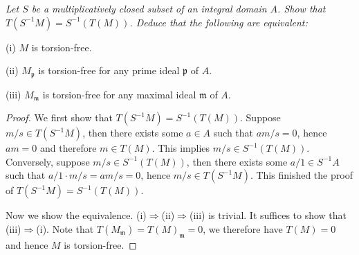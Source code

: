 \begin{problem}\em
Let $S$ be a multiplicatively closed subset of an integral domain $A$. Show that $T(S^{-1}M)=S^{-1}(T(M))$. Deduce that the following are equivalent: \par
(i) $M$ is torsion-free.\par
(ii) $M_\mathfrak{p}$ is torsion-free for any prime ideal $\mathfrak{p}$ of $A$.\par
(iii) $M_\mathfrak{m}$ is torsion-free for any maximal ideal $\mathfrak{m}$ of $A$.
\end{problem}
\begin{proof}
We first show that $T(S^{-1}M)=S^{-1}(T(M))$. Suppose $m/s\in T(S^{-1}M)$, then there exists some $a\in A$ such that $am/s=0$, hence $am=0$ and therefore $m\in T(M)$. This implies $m/s\in S^{-1}(T(M))$. Conversely, suppose $m/s\in S^{-1}(T(M))$, then there exists some $a/1\in S^{-1}A$ such that $a/1\cdot m/s=am/s=0$, hence $m/s\in T(S^{-1}M)$. This finished the proof of $T(S^{-1}M)=S^{-1}(T(M))$.\par
Now we show the equivalence. (i)$\Rightarrow$(ii)$\Rightarrow$(iii) is trivial. It suffices to show that (iii)$\Rightarrow$(i). Note that $T\left( M_{\mathfrak{m}} \right) =T\left( M \right) _{\mathfrak{m}}=0$, we therefore have $T(M)=0$ and hence $M$ is torsion-free.
\end{proof}